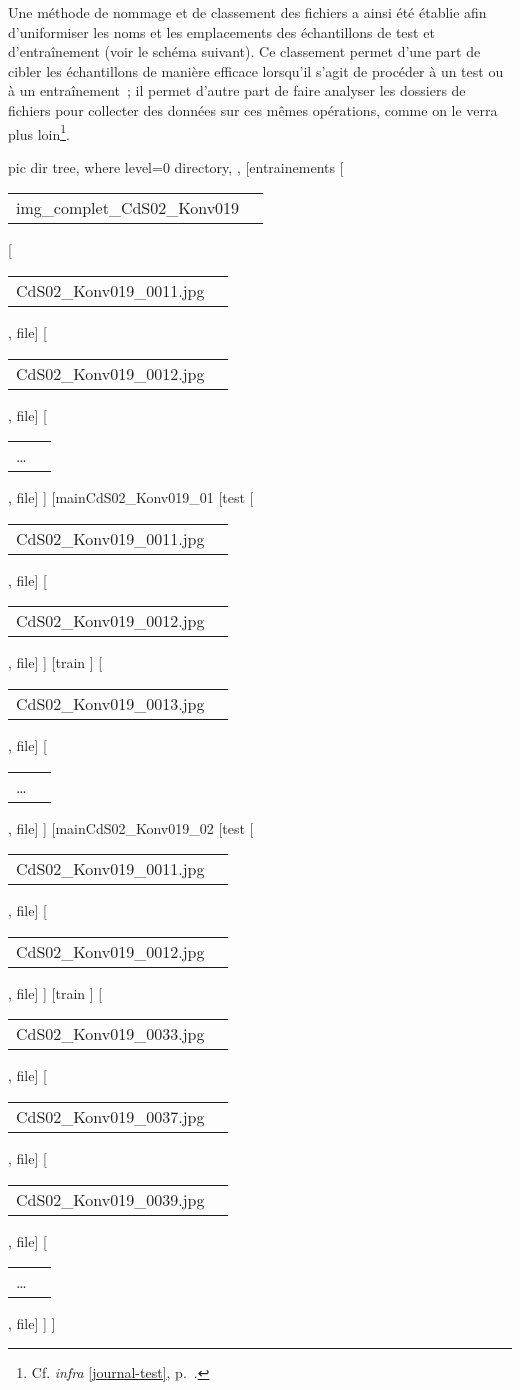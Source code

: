 \documentclass[a4paper,12pt,twoside]{book}
\makeatletter
\newcommand{\fname}[2]{\begin{tabular}{m{1cm}@{\quad}m{4cm}}#1 & \normalfont#2\end{tabular}}
\makeatother
\begin{document}
				Une méthode de nommage et de classement des fichiers a ainsi été établie afin d'uniformiser les noms et les emplacements des échantillons de test et d'entraînement (voir le schéma suivant). Ce classement permet d'une part de cibler les échantillons de manière efficace lorsqu'il s'agit de procéder à un test ou à un entraînement~; il permet d'autre part de faire analyser les dossiers de fichiers pour collecter des données sur ces mêmes opérations, comme on le verra plus loin\footnote{Cf. \textit{infra} \ref{journal-test}, p.~\pageref{journal-test}.}.
				
				
				\pagebreak
				
				\begin{forest}
					pic dir tree,
					where level=0{}{%
						directory,
					},
					[entrainements
					 [\fname{img\_complet\_CdS02\_Konv019}{}
 					 [\fname{CdS02\_Konv019\_0011.jpg}{}, file]
					 [\fname{CdS02\_Konv019\_0012.jpg}{}, file]
					 [\fname{…}{}, file]
 					 ]
 					 [mainCdS02\_Konv019\_01
 					 [test
 					  [\fname{CdS02\_Konv019\_0011.jpg}{}, file]
 					  [\fname{CdS02\_Konv019\_0012.jpg}{}, file]
 					 ]
 					 [train
 					 ]
 					 [\fname{CdS02\_Konv019\_0013.jpg}{}, file]
 					 [\fname{…}{}, file]
					 ]
					 [mainCdS02\_Konv019\_02
					 [test
					 [\fname{CdS02\_Konv019\_0011.jpg}{}, file]
					 [\fname{CdS02\_Konv019\_0012.jpg}{}, file]
					 ]
					 [train
					 ]
 					 [\fname{CdS02\_Konv019\_0033.jpg}{}, file]
					 [\fname{CdS02\_Konv019\_0037.jpg}{}, file]
					 [\fname{CdS02\_Konv019\_0039.jpg}{}, file]
					 [\fname{…}{}, file]
					 ]
					]
				\end{forest}
			
				\pagebreak
				
\end{document}
